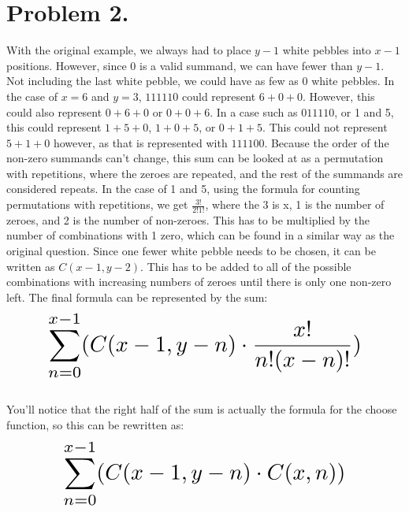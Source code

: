 \documentclass{article}
\begin{document}
\section*{Problem 2.}
With the original example, we always had to place $y-1$ white pebbles into $x-1$ positions. However, since 0 is a valid summand, we can have fewer than $y-1$. Not including the last white pebble, we could have as few as 0 white pebbles. In the case of $x=6$ and $y=3$, $111110$ could represent $6+0+0$. However, this could also represent $0+6+0$ or $0+0+6$. In a case such as $011110$, or 1 and 5, this could represent $1+5+0$, $1+0+5$, or $0+1+5$. This could not represent $5+1+0$ however, as that is represented with $111100$. Because the order of the non-zero summands can't change, this sum can be looked at as a permutation with repetitions, where the zeroes are repeated, and the rest of the summands are considered repeats. In the case of 1 and 5, using the formula for counting permutations with repetitions, we get $\frac{3!}{2!1!}$, where the 3 is x, 1 is the number of zeroes, and 2 is the number of  non-zeroes. This has to be multiplied by the number of combinations with 1 zero, which can be found in a similar way as the original question. Since one fewer white pebble needs to be chosen, it can be written as $C(x-1,y-2)$. This has to be added to all of the possible combinations with increasing numbers of zeroes until there is only one non-zero left. The final formula can be represented by the sum:\\
\[ \scalebox{2}{$\displaystyle \sum_{n=0}^{x-1} (C(x-1,y-n)\cdot \frac{x!}{n!(x-n)!}) $} \]\\
You'll notice that the right half of the sum is actually the formula for the choose function, so this can be rewritten as:\\
\[ \scalebox{2}{$\displaystyle \sum_{n=0}^{x-1} (C(x-1,y-n)\cdot C(x,n)) $} \]\\
\end{document}
